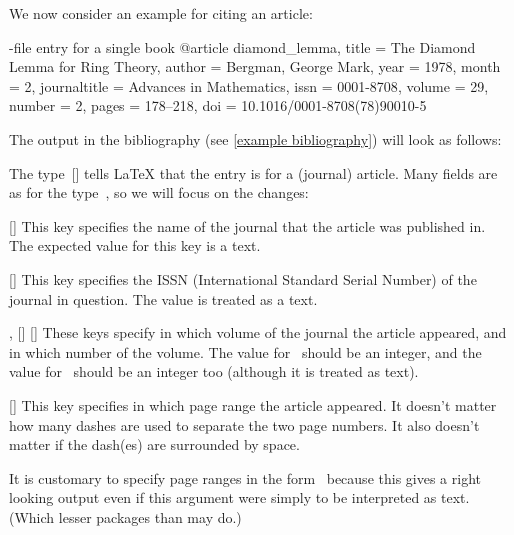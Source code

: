 We now consider an example for citing an article:

\begin{showcode}[label = {bib entry article}]{-file entry for a single book}
@article {diamond_lemma,
  title         = {The Diamond Lemma for Ring Theory},
  author        = {Bergman, George Mark},
  year          = {1978},
  month         = {2},
  journaltitle  = {Advances in Mathematics},
  issn          = {0001-8708},
  volume        = {29},
  number        = {2},
  pages         = {178--218},
  doi           = {10.1016/0001-8708(78)90010-5}
}
\end{showcode}
The output in the bibliography (see \cref{example bibliography}) will look as follows:

The type~[\atname] tells {\LaTeX} that the entry is for a (journal) article.
Many fields are as for the type~, so we will focus on the changes:
\begin{mydescription}
  \item[\optname{journaltitle}]
    [\optname]
    This key specifies the name of the journal that the article was published in.
    The expected value for this key is a text.
  \item[\optname{issn}]
    [\optname]
    This key specifies the ISSN (International Standard Serial Number) of the journal in question.
    The value is treated as a text.
  \item[\optname{volume}, \optname{number}]
    [\optname]
    [\optname]
    These keys specify in which volume of the journal the article appeared, and in which number of the volume.
    The value for~ should be an integer, and the value for~ should be an integer too (although it is treated as text).
  \item[\optname{pages}]
    [\optname]
    This key specifies in which page range the article appeared.
    It doesn’t matter how many dashes are used to separate the two page numbers.
    It also doesn’t matter if the dash(es) are surrounded by space.
    
    It is customary to specify page ranges in the form~ because this gives a right looking output even if this argument were simply to be interpreted as text.
    (Which lesser packages than  may do.)
\end{mydescription}

